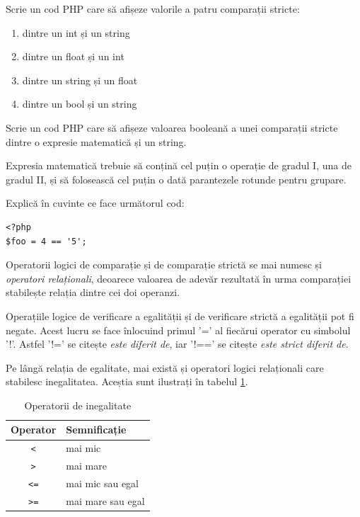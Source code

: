 \begin{Exercise}[title={Verifică-ți puterea de a face analogii},difficulty=1]
Scrie un cod PHP care să afișeze valorile a patru comparații stricte:
\begin{enumerate}
	\item dintre un int și un string
	\item dintre un float și un int
	\item dintre un string și un float
	\item dintre un bool și un string
\end{enumerate}
\end{Exercise}

\begin{Exercise}[title={Am sintetizat corect noțiunea de \textit{expresie}?},difficulty=2]
\ExePart
Scrie un cod PHP care să afișeze valoarea booleană a unei comparații
stricte dintre o expresie matematică și un string.

Expresia matematică trebuie să conțină cel puțin o operație de gradul I, una
de gradul II, și să folosească cel puțin o dată parantezele rotunde pentru
grupare.
\ExePart

Explică în cuvinte ce face următorul cod:

\begin{lstlisting}
<?php
$foo = 4 == '5';
\end{lstlisting}
\end{Exercise}

Operatorii logici de comparație și de comparație strictă se mai numesc
și \textsl{operatori relaționali}, deoarece valoarea de adevăr rezultată
în urma comparației stabilește relația dintre cei doi operanzi.

Operațiile logice de verificare a egalității și de verificare strictă
a egalității pot fi negate. Acest lucru se face înlocuind primul '='
al fiecărui operator cu simbolul '!'. Astfel '!=' se citește \textit{este diferit de},
iar '!==' se citește \textit{este strict diferit de}.

Pe lângă relația de egalitate, mai există și operatori logici relaționali
care stabilesc inegalitatea. Aceștia sunt ilustrați în
tabelul \ref{tbl:operatori inegalitate}.

\begin{table}[ht!]
  \begin{center}
  	  \begin{tabular}{| c | l |}
	  \hline
	  Operator & Semnificație \\
	  \hline
	  \texttt{<}	& mai mic \\
	  \texttt{>}	& mai mare \\
	  \texttt{<=}	& mai mic sau egal \\
	  \texttt{>=}	& mai mare sau egal \\
	  \hline
	  \end{tabular}
  \end{center}
  \caption{Operatorii de inegalitate}
  \label{tbl:operatori inegalitate}
\end{table}


